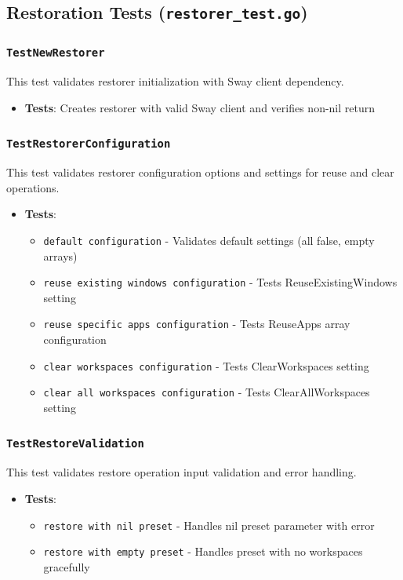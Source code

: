 \subsection{Restoration Tests (\texttt{restorer\_test.go})}

\subsubsection*{\texttt{TestNewRestorer}}
This test validates restorer initialization with Sway client dependency.
\begin{itemize}
    \item \textbf{Tests}: Creates restorer with valid Sway client and verifies non-nil return
\end{itemize}

\subsubsection*{\texttt{TestRestorerConfiguration}}
This test validates restorer configuration options and settings for reuse and clear operations.
\begin{itemize}
    \item \textbf{Tests}:
    \begin{itemize}
        \item \texttt{default configuration} - Validates default settings (all false, empty arrays)
        \item \texttt{reuse existing windows configuration} - Tests ReuseExistingWindows setting
        \item \texttt{reuse specific apps configuration} - Tests ReuseApps array configuration
        \item \texttt{clear workspaces configuration} - Tests ClearWorkspaces setting
        \item \texttt{clear all workspaces configuration} - Tests ClearAllWorkspaces setting
    \end{itemize}
\end{itemize}

\subsubsection*{\texttt{TestRestoreValidation}}
This test validates restore operation input validation and error handling.
\begin{itemize}
    \item \textbf{Tests}:
    \begin{itemize}
        \item \texttt{restore with nil preset} - Handles nil preset parameter with error
        \item \texttt{restore with empty preset} - Handles preset with no workspaces gracefully
    \end{itemize}
\end{itemize}

